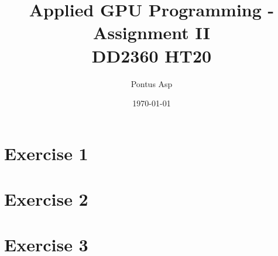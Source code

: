 \documentclass[a4paper, 12pt]{article}
\begin{document}
\title{\vspace{4.0cm}Applied GPU Programming - Assignment II\\
\large DD2360 HT20}
\author{Pontus Asp}
\date{\today}
\maketitle
\thispagestyle{empty}
\newpage

\clearpage
{}

\section{Exercise 1}
\section{Exercise 2}
\section{Exercise 3}
\end{document}
